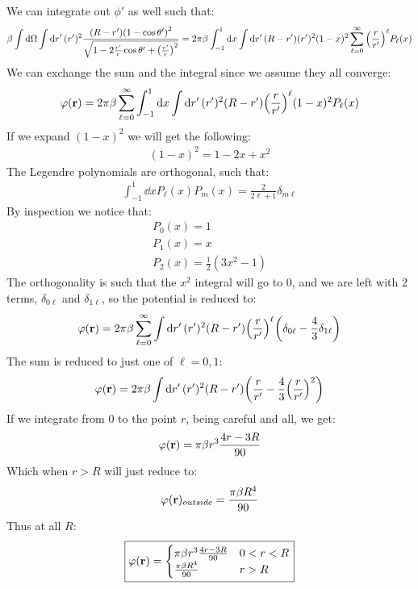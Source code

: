 \documentclass[12pt]{article}
\newcommand{\vphi}{\varphi}
\begin{document}
We can integrate out $\phi'$ as well such that:
\begin{align*}
  \beta\int\dd{\Omega}\int\dd{r'}(r')^2
  \frac{(R-r')\qty(1-\cos\theta')^2}
  {\sqrt{1-2\frac{r'}{r}\cos\theta'+\qty(\frac{r'}{r})^2}}=
  2\pi\beta\int_{-1}^1\dd{x}
  \int\dd{r'}(R-r')(r')^2(1-x)^2\sum_{\ell=0}^\infty
  \qty(\frac{r}{r'})^\ell P_{\ell}(x)
\end{align*}
We can exchange the sum and the integral since we assume they all converge:
\begin{align*}
  \vphi(\vb{r})=2\pi\beta\sum_{\ell=0}^\infty\int_{-1}^1\dd{x}\int\dd{r'}
  (r')^2(R-r')\qty(\frac{r}{r'})^\ell(1-x)^2P_{\ell}(x)
\end{align*}
If we expand $(1-x)^2$ we will get the following:
\begin{align*}
  (1-x)^2=1-2x+x^2
\end{align*}
The Legendre polynomials are orthogonal, such that:
\begin{align*}
  \int_{-1}^1\dd{x}P_\ell(x)P_m(x)=\frac2{2\ell+1}\delta_{m\ell}
\end{align*}
By inspection we notice that:
\begin{gather*}
  P_0(x)=1\\
  P_1(x)=x\\
  P_2(x)=\frac12(3x^2-1)
\end{gather*}
The orthogonality is such that the $x^2$ integral will go to $0$, and we are left with 2 terms, $\delta_{0\ell}$ and $\delta_{1\ell}$, so the potential is reduced to:
\begin{align*}
  \vphi(\vb{r})=2\pi\beta\sum_{\ell=0}^\infty\int\dd{r'}
  (r')^2(R-r')\qty(\frac{r}{r'})^\ell\qty(\delta_{0\ell}-\frac43\delta_{1\ell})
\end{align*}
The sum is reduced to just one of $\ell=0,1$:
\begin{align*}
  \vphi(\vb{r})=2\pi\beta\int\dd{r'}
  (r')^2(R-r')\qty(\frac{r}{r'}-\frac43\qty(\frac{r}{r'})^2)
\end{align*}
If we integrate from $0$ to the point $r$, being careful and all, we get:
\begin{align*}
  \vphi(\vb{r})=\pi\beta r^3\frac{4r-3R}{90}
\end{align*}
Which when $r>R$ will just reduce to:
\begin{align*}
  \vphi(\vb{r})_{outside}=\frac{\pi\beta R^4}{90}
\end{align*}
Thus at all $R$:
\begin{equation}
  \boxed{
    \begin{aligned}
      \vphi(\vb{r})=
      \begin{cases}
        \pi\beta r^3\frac{4r-3R}{90} & 0<r<R\\
        \frac{\pi\beta R^4}{90} & r>R
      \end{cases}
    \end{aligned}
  }
\end{equation}
\end{document}
